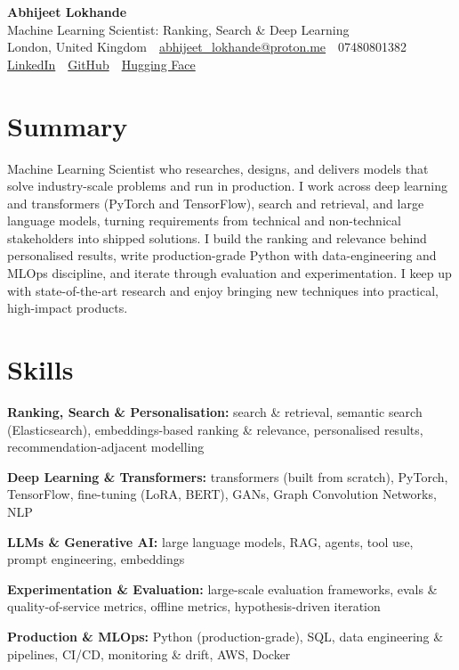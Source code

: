 \documentclass[10pt,a4paper]{article}
\newcommand{\sep}{\,\textcolor{accent!60}{\textbar}\,}
\begin{document}
\begin{center}
  {\fontsize{24}{26}\selectfont\bfseries Abhijeet Lokhande}\\[3pt]
  {\color{accent}\large Machine Learning Scientist: Ranking, Search \& Deep Learning}\\[5pt]
  {\small
    London, United Kingdom \sep
    \href{mailto:abhijeet_lokhande@proton.me}{abhijeet\_lokhande@proton.me} \sep
    07480801382 \\[2pt]
    \href{https://www.linkedin.com/in/ablds/}{LinkedIn} \sep
    \href{https://github.com/abhijeetscode}{GitHub} \sep
    \href{https://huggingface.co/ab-ai}{Hugging Face}
  }
\end{center}
\vspace{2pt}

\section{Summary}
Machine Learning Scientist who researches, designs, and delivers models that solve industry-scale problems and run in production. I work across deep learning and transformers (PyTorch and TensorFlow), search and retrieval, and large language models, turning requirements from technical and non-technical stakeholders into shipped solutions. I build the ranking and relevance behind personalised results, write production-grade Python with data-engineering and MLOps discipline, and iterate through evaluation and experimentation. I keep up with state-of-the-art research and enjoy bringing new techniques into practical, high-impact products.

\section{Skills}
\begin{tight}
  \item[\textcolor{accent}{\small$\bullet$}] \textbf{Ranking, Search \& Personalisation:} search \& retrieval, semantic search (Elasticsearch), embeddings-based ranking \& relevance, personalised results, recommendation-adjacent modelling
  \item[\textcolor{accent}{\small$\bullet$}] \textbf{Deep Learning \& Transformers:} transformers (built from scratch), PyTorch, TensorFlow, fine-tuning (LoRA, BERT), GANs, Graph Convolution Networks, NLP
  \item[\textcolor{accent}{\small$\bullet$}] \textbf{LLMs \& Generative AI:} large language models, RAG, agents, tool use, prompt engineering, embeddings
  \item[\textcolor{accent}{\small$\bullet$}] \textbf{Experimentation \& Evaluation:} large-scale evaluation frameworks, evals \& quality-of-service metrics, offline metrics, hypothesis-driven iteration
  \item[\textcolor{accent}{\small$\bullet$}] \textbf{Production \& MLOps:} Python (production-grade), SQL, data engineering \& pipelines, CI/CD, monitoring \& drift, AWS, Docker
\end{tight}
\end{document}
